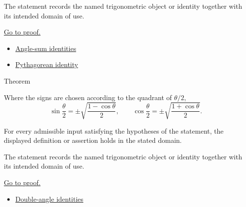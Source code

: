 \begin{remark*}[Interpretation]
The statement records the named trigonometric object or identity together with
its intended domain of use.
\end{remark*}

\begin{remark*}[Proof]
\hyperref[prf:trig-double-angle-identities]{Go to proof.}
\end{remark*}
\begin{dependencies}
\begin{itemize}
  \item \hyperref[thm:trig-angle-sum-identities]{Angle-sum identities}
  \item \hyperref[thm:pythagorean-trig-identity]{Pythagorean identity}
\end{itemize}
\end{dependencies}



\begin{theorembox}{Theorem}
\begin{theorem}
\label{thm:trig-half-angle-identities}
Where the signs are chosen according to the quadrant of $\theta/2$,
\[
  \sin\frac{\theta}{2}=\pm\sqrt{\frac{1-\cos\theta}{2}},
  \qquad
  \cos\frac{\theta}{2}=\pm\sqrt{\frac{1+\cos\theta}{2}}.
\]
\end{theorem}
\end{theorembox}
\begin{remark*}
For every admissible input satisfying the hypotheses of the statement, the
displayed definition or assertion holds in the stated domain.
\end{remark*}

\begin{remark*}[Interpretation]
The statement records the named trigonometric object or identity together with
its intended domain of use.
\end{remark*}

\begin{remark*}[Proof]
\hyperref[prf:trig-half-angle-identities]{Go to proof.}
\end{remark*}
\begin{dependencies}
\begin{itemize}
  \item \hyperref[thm:trig-double-angle-identities]{Double-angle identities}
\end{itemize}
\end{dependencies}


